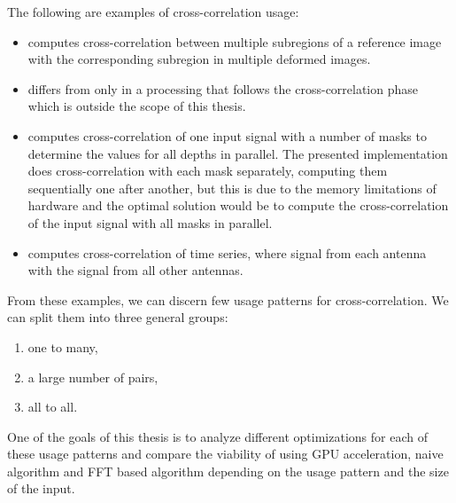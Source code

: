 The following are examples of cross-correlation usage:
\begin{itemize}
	\item \citet{misko} computes cross-correlation between multiple subregions of a reference image with the corresponding subregion in multiple deformed images.
	\item \citet{zhang2015} differs from \citep{misko} only in a processing that follows the cross-correlation phase which is outside the scope of this thesis.
	\item \citet{Kapinchev2015} computes cross-correlation of one input signal with a number of masks to determine the values for all depths in parallel. The presented implementation does cross-correlation with each mask separately, computing them sequentially one after another, but this is due to the memory limitations of hardware and the optimal solution would be to compute the cross-correlation of the input signal with all masks in parallel.
	\item \citet{Clark2011} computes cross-correlation of time series, where signal from each antenna with the signal from all other antennas.
\end{itemize}

From these examples, we can discern few usage patterns for cross-correlation. We can split them into three general groups:

\begin{enumerate}
	\item one to many,
	\item a large number of pairs,
	\item all to all.
\end{enumerate} 


One of the goals of this thesis is to analyze different optimizations for each of these usage patterns and compare the viability of using GPU acceleration, naive algorithm and FFT based algorithm depending on the usage pattern and the size of the input.
